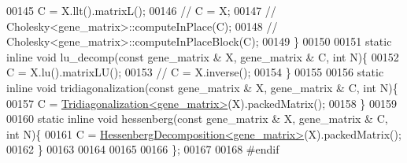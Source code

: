 \begin{DoxyCode}
00145     C = X.llt().matrixL();
00146 \textcolor{comment}{//     C = X;}
00147 \textcolor{comment}{//     Cholesky<gene\_matrix>::computeInPlace(C);}
00148 \textcolor{comment}{//     Cholesky<gene\_matrix>::computeInPlaceBlock(C);}
00149   \}
00150 
00151   \textcolor{keyword}{static} \textcolor{keyword}{inline} \textcolor{keywordtype}{void} lu\_decomp(\textcolor{keyword}{const} gene\_matrix & X, gene\_matrix & C, \textcolor{keywordtype}{int} N)\{
00152     C = X.lu().matrixLU();
00153 \textcolor{comment}{//     C = X.inverse();}
00154   \}
00155 
00156   \textcolor{keyword}{static} \textcolor{keyword}{inline} \textcolor{keywordtype}{void} tridiagonalization(\textcolor{keyword}{const} gene\_matrix & X, gene\_matrix & C, \textcolor{keywordtype}{int} N)\{
00157     C = \hyperlink{group___eigenvalues___module_class_eigen_1_1_tridiagonalization}{Tridiagonalization<gene\_matrix>}(X).packedMatrix();
00158   \}
00159 
00160   \textcolor{keyword}{static} \textcolor{keyword}{inline} \textcolor{keywordtype}{void} hessenberg(\textcolor{keyword}{const} gene\_matrix & X, gene\_matrix & C, \textcolor{keywordtype}{int} N)\{
00161     C = \hyperlink{group___eigenvalues___module_class_eigen_1_1_hessenberg_decomposition}{HessenbergDecomposition<gene\_matrix>}(X).packedMatrix();
00162   \}
00163 
00164 
00165 
00166 \};
00167 
00168 \textcolor{preprocessor}{#endif}
\end{DoxyCode}
